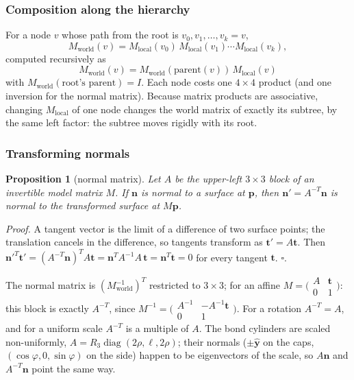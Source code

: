 \documentclass[a4paper, 11pt]{article}
\newtheorem{proposition}{{\bf Proposition}}
\begin{document}
\subsubsection{Composition along the hierarchy}\label{sec:hier}

For a node $v$ whose path from the root is $v_0,v_1,\dots,v_k=v$,
\[
  M_{\text{world}}(v)=M_{\text{local}}(v_0)\,M_{\text{local}}(v_1)\cdots M_{\text{local}}(v_k),
\]
computed recursively as 
\[M_{\text{world}}(v)=M_{\text{world}}(\text{parent}(v))\,M_{\text{local}}(v)\] 
with $M_{\text{world}}(\text{root's parent})=I$.
Each node costs one $4\times4$ product (and one inversion for the normal matrix). Because matrix products are associative, changing $M_{\text{local}}$ of one node changes the world matrix of exactly its subtree,
by the same left factor: the subtree moves rigidly with its root.

\subsubsection{Transforming normals}

\begin{proposition}[normal matrix]\label{prop:normal}
Let $A$ be the upper-left $3\times3$ block of an invertible model matrix $M$. If $\mathbf n$ is normal to a surface at $\mathbf p$,
then $\mathbf n'=A^{-T}\mathbf n$ is normal to the transformed surface at $M\mathbf p$.
\end{proposition}
\noindent\textit{Proof.} A tangent vector is the limit of a difference of two surface points; the translation cancels in the difference,
so tangents transform as $\mathbf t'=A\mathbf t$. Then
$\mathbf n'^{T}\mathbf t'=(A^{-T}\mathbf n)^{T}A\mathbf t=\mathbf n^{T}A^{-1}A\,\mathbf t=\mathbf n^{T}\mathbf t=0$ for every tangent $\mathbf t$. \hfill$\square$. 

The normal matrix is $(M_{\text{world}}^{-1})^{T}$ restricted to $3\times3$; for an affine $M=\bigl(\begin{smallmatrix}A&\mathbf t\\0&1\end{smallmatrix}\bigr)$: this block is exactly $A^{-T}$, since $M^{-1}=\bigl(\begin{smallmatrix}A^{-1}&-A^{-1}\mathbf t\\0&1\end{smallmatrix}\bigr)$. For a rotation $A^{-T}=A$, and for a uniform scale $A^{-T}$ is a multiple of $A$. The bond cylinders are scaled non-uniformly, $A=R_3\operatorname{diag}(2\rho,\ell,2\rho)$; their normals ($\pm\hat{\mathbf y}$ on the caps,
$(\cos\varphi,0,\sin\varphi)$ on the side) happen to be eigenvectors of the scale, so $A\mathbf n$ and $A^{-T}\mathbf n$ point the same way.
\end{document}
